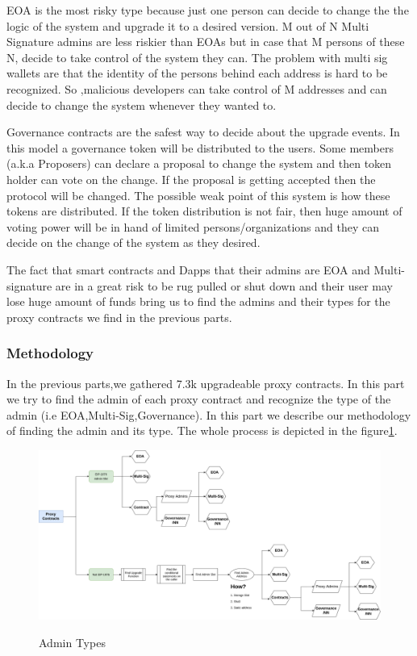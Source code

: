 EOA is the most risky type because just one person can decide to change the the logic of the system and upgrade it to a desired version. M out of N Multi Signature admins are less riskier than EOAs but in case that M persons of these N, decide to take control of the system they can. The problem with multi sig wallets are that the identity of the persons behind each address is hard to be recognized. So ,malicious developers can take control of M addresses and can decide to change the system whenever they wanted to.

Governance contracts are the safest way to decide about the upgrade events. In this model a governance token will be distributed to the users. Some members (a.k.a Proposers) can declare a proposal to change the system and then token holder can vote on the change. If the proposal is getting accepted then the protocol will be changed. The possible weak point of this system is how these tokens are distributed. If the token distribution is not fair, then huge amount of voting power will be in hand of limited persons/organizations and they can decide on the change of the system as they desired.

The fact that smart contracts and Dapps that their admins are EOA and Multi-signature are in a great risk to be rug pulled or shut down and their user may lose huge amount of funds bring us to find the admins and their types for the proxy contracts we find in the previous parts.
\subsubsection{Methodology}

In the previous parts,we gathered 7.3k upgradeable proxy contracts. In this part we try to find the admin of each proxy contract and recognize the type of the admin (i.e EOA,Multi-Sig,Governance).
In this part we describe our methodology of finding the admin and its type. The whole process is depicted in the figure\ref{Admins}.

\begin{figure}
  \centering
  \includegraphics[width=1.0\textwidth]{figures/Admins.png}\label{Admins}
  \caption{Admin Types}
\end{figure}

